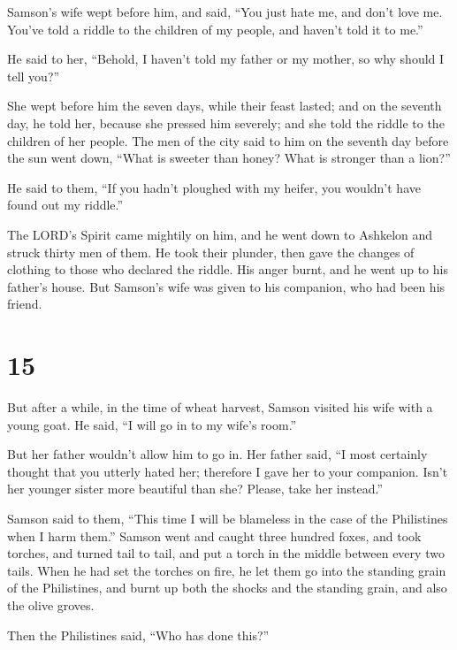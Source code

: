  Samson's wife wept before him, and said, ``You just hate
me, and don't love me. You've told a riddle to the children of my
people, and haven't told it to me.''

He said to her, ``Behold, I haven't told my father or my mother, so why
should I tell you?''

 She wept before him the seven days, while their feast
lasted; and on the seventh day, he told her, because she pressed him
severely; and she told the riddle to the children of her people.
 The men of the city said to him on the seventh day
before the sun went down, ``What is sweeter than honey? What is stronger
than a lion?''

He said to them, ``If you hadn't ploughed with my heifer, you wouldn't
have found out my riddle.''

 The LORD's Spirit came mightily on him, and he went down
to Ashkelon and struck thirty men of them. He took their plunder, then
gave the changes of clothing to those who declared the riddle. His anger
burnt, and he went up to his father's house.  But
Samson's wife was given to his companion, who had been his friend.

\hypertarget{section-14}{%
\section{15}\label{section-14}}

 But after a while, in the time of wheat harvest, Samson
visited his wife with a young goat. He said, ``I will go in to my wife's
room.''

But her father wouldn't allow him to go in.  Her father
said, ``I most certainly thought that you utterly hated her; therefore I
gave her to your companion. Isn't her younger sister more beautiful than
she? Please, take her instead.''

 Samson said to them, ``This time I will be blameless in
the case of the Philistines when I harm them.''  Samson
went and caught three hundred foxes, and took torches, and turned tail
to tail, and put a torch in the middle between every two tails.
 When he had set the torches on fire, he let them go into
the standing grain of the Philistines, and burnt up both the shocks and
the standing grain, and also the olive groves.

 Then the Philistines said, ``Who has done this?''

